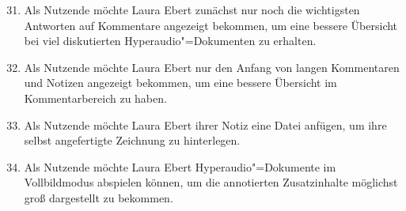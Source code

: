 \begin{enumerate}[leftmargin=1.3cm,label=US-\arabic*:,ref=US-\arabic*]
\setcounter{enumi}{30}
\item \label{US-Kommentar-Bewertung} Als Nutzende möchte Laura Ebert zunächst nur noch die wichtigsten Antworten auf Kommentare angezeigt bekommen, um eine bessere Übersicht bei viel diskutierten Hyperaudio"=Dokumenten zu erhalten.
\item Als Nutzende möchte Laura Ebert nur den Anfang von langen Kommentaren und Notizen angezeigt bekommen, um eine bessere Übersicht im Kommentarbereich zu haben.
\item Als Nutzende möchte Laura Ebert ihrer Notiz eine Datei anfügen, um ihre selbst angefertigte Zeichnung zu hinterlegen.
\item Als Nutzende möchte Laura Ebert Hyperaudio"=Dokumente im Vollbildmodus abspielen können, um die annotierten Zusatzinhalte möglichst groß dargestellt zu bekommen.

\end{enumerate}
